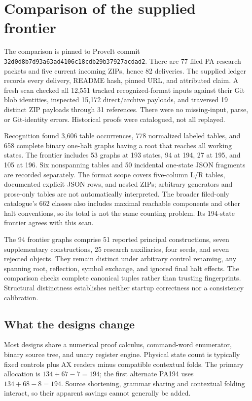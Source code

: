 \section{Comparison of the supplied frontier}
\label{sec:frontier-census-new}

The comparison is pinned to ProveIt commit
\texttt{32d0d8b7d93a63ad4106c18cdb29b37927acdad2}.
There are 77 filed PA research packets and five current incoming ZIPs,
hence 82 deliveries. The supplied ledger records every delivery, README
hash, pinned URL, and attributed claim. A fresh scan checked all 12,551
tracked recognized-format inputs against their Git blob identities,
inspected 15,172 direct/archive payloads, and traversed 19 distinct ZIP
payloads through 31 references. There were no missing-input, parse, or
Git-identity errors. Historical proofs were catalogued, not all replayed.

Recognition found 3,606 table occurrences, 778 normalized labeled tables,
and 658 complete binary one-halt graphs having a root that reaches all
working states. The frontier includes 53 graphs at 193 states, 94 at 194,
27 at 195, and 105 at 196. Six nonspanning tables and 50 incidental
one-state JSON fragments are recorded separately. The format scope covers
five-column L/R tables, documented explicit JSON rows, and nested ZIPs;
arbitrary generators and prose-only tables are not automatically interpreted.
The broader filed-only catalogue's 662 classes also includes maximal
reachable components and other halt conventions, so its total is not the
same counting problem. Its 194-state frontier agrees with this scan.

The 94 frontier graphs comprise 51 reported principal constructions,
seven supplementary constructions, 25 research auxiliaries, four seeds,
and seven rejected objects. They remain distinct under arbitrary control
renaming, any spanning root, reflection, symbol exchange, and ignored final
halt effects. The comparison checks complete canonical tuples rather than
trusting fingerprints. Structural distinctness establishes neither startup
correctness nor a consistency calibration.

\subsection{What the designs change}

Most designs share a numerical proof calculus, command-word enumerator,
binary source tree, and unary register engine. Physical state count is
typically fixed controls plus AX readers minus compatible contextual folds.
The primary allocation is $134+67-7=194$; the first alternate PA194 uses
$134+68-8=194$. Source shortening, grammar sharing and contextual folding
interact, so their apparent savings cannot generally be added.

